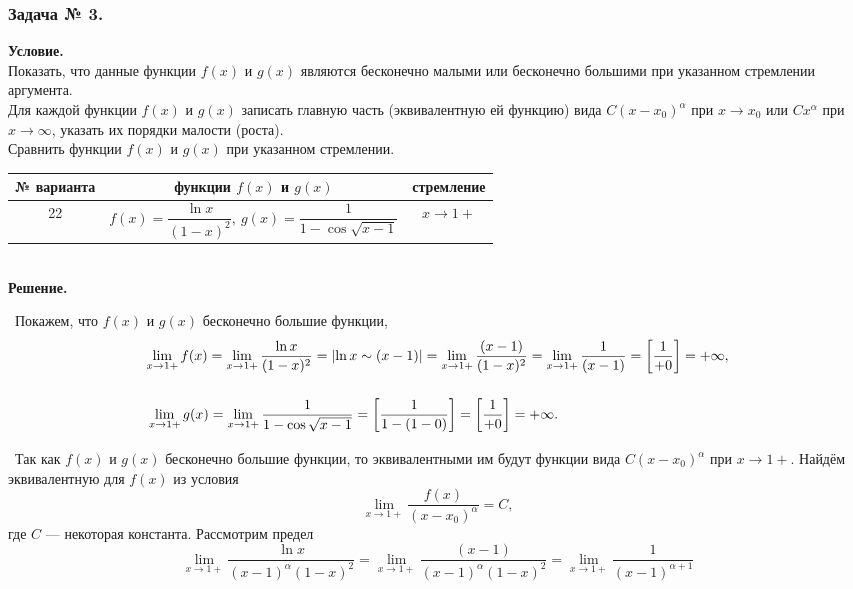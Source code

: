 \documentclass[12pt]{article}
\begin{document}
	\subsubsection*{\center Задача № 3.}
	{\bf Условие.~}\\
	 Показать, что данные функции
	$f(x)$ и $g(x)$ являются бесконечно малыми или бесконечно большими
	при указанном стремлении аргумента. \\
	 Для каждой функции $f(x)$ и $g(x)$ записать главную часть
	(эквивалентную ей функцию)  вида $C(x-x_0)^{\alpha}$ при $x\rightarrow x_0$ или $Cx^{\alpha}$
	при $x\rightarrow\infty$, указать их порядки малости (роста). \\
	 Сравнить функции $f(x)$ и $g(x)$ при указанном стремлении.
	\begin{center}
		\begin{tabular}{|c|c|c|}
			\hline
			№ варианта & функции $f(x)$ и $g(x)$ & стремление \\[6pt]
			\hline
			22 & $f(x) = \dfrac{\ln{x}}{(1-x)^2},~g(x)=\dfrac{1}{1-\cos\sqrt{x-1}}$ & $x\rightarrow1+$ \\
			\hline
		\end{tabular}
		\bigskip
		\\
		{\bf Решение.~}\\
	\end{center}
	\medskip
	~Покажем, что $f(x)$ и $g(x)$ бесконечно большие функции,
	$$
	\begin{array}{l} 
		\lim\limits_{x\rightarrow 1+} f(x)=\lim\limits_{x\rightarrow 1+} \dfrac{\ln{x}}{(1-x)^2}=\left|\ln {x} \sim (x-1) \right|=\lim\limits_{x\rightarrow 1+} \dfrac{(x-1)}{(1-x)^2}=\lim\limits_{x\rightarrow 1+} \dfrac{1}{(x-1)}=\left[\dfrac{1}{+0} \right]=+\infty , 
		\\ \medskip{}{}
		\\ \medskip{}{}
		\lim\limits_{x\rightarrow 1+} g(x)= \lim\limits_{x\rightarrow 1+}  \dfrac{1}{1-\cos\sqrt{x-1}}=\left[\dfrac{1}{1-(1-0)} \right]=\left[\dfrac{1}{+0} \right]=+\infty.
	\end{array}
	$$
	~Так как $f(x)$ и $g(x)$ бесконечно большие функции, то эквивалентными им будут функции вида 
	$C(x-x_0)^{\alpha}$ при $x\rightarrow 1+$. Найдём эквивалентную для $f(x)$ из условия
	$$
	\lim\limits_{x\rightarrow 1+}\dfrac{f(x)}{(x-x_0)^{\alpha}} = C,
	$$
	где $C$ --- некоторая константа. Рассмотрим предел
	$$
	\lim\limits_{x\rightarrow 1+} \dfrac{\ln{x}}{(x-1)^{\alpha} (1-x)^2}=\lim\limits_{x\rightarrow 1+} \dfrac{(x-1)}{(x-1)^{\alpha}(1-x)^2}=\lim\limits_{x\rightarrow 1+} \dfrac{1}{(x-1)^{\alpha+1}}
	$$
\end{document}
